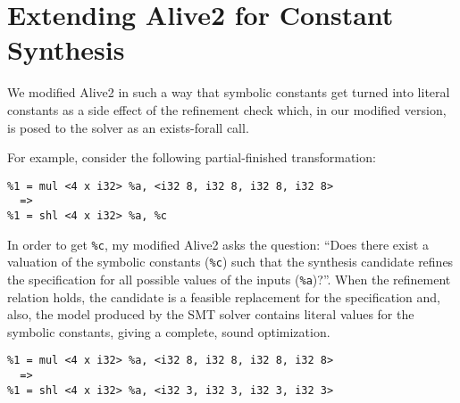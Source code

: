 \section {Extending Alive2 for Constant Synthesis}

We modified Alive2 in such a way that symbolic constants get turned
into literal constants as a side effect of the refinement check which,
in our modified version, is posed to the solver as an exists-forall
call.
%

For example, consider the following partial-finished transformation:

\begin{verbatim}
%1 = mul <4 x i32> %a, <i32 8, i32 8, i32 8, i32 8>
  =>
%1 = shl <4 x i32> %a, %c
\end{verbatim}


In order to get \texttt{\%c}, my modified Alive2 asks the question: ``Does
there exist a valuation of the symbolic constants (\texttt{\%c}) such
that the synthesis candidate refines the specification for all
possible values of the inputs (\texttt{\%a})?''.
%
When the refinement relation holds, the candidate is a feasible
replacement for the specification and, also, the model produced by the
SMT solver contains literal values for the symbolic constants, giving
a complete, sound optimization.

\begin{verbatim}
%1 = mul <4 x i32> %a, <i32 8, i32 8, i32 8, i32 8>
  =>
%1 = shl <4 x i32> %a, <i32 3, i32 3, i32 3, i32 3>
\end{verbatim}
